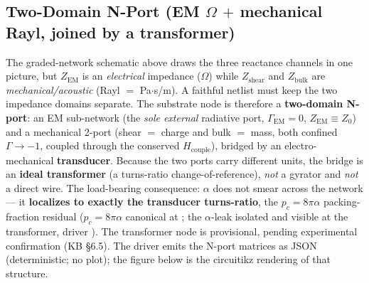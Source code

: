 \subsection{Two-Domain N-Port (EM $\Omega$ $+$ mechanical Rayl, joined by a transformer)}
\label{sec:vol9_node_2domain_nport}

\noindent The graded-network schematic above draws the three reactance channels in one picture, but $Z_{\mathrm{EM}}$ is an \emph{electrical} impedance ($\Omega$) while $Z_{\mathrm{shear}}$ and $Z_{\mathrm{bulk}}$ are \emph{mechanical/acoustic} (Rayl $=$ Pa$\cdot$s/m). A faithful netlist must keep the two impedance domains separate. The substrate node is therefore a \textbf{two-domain N-port}: an EM sub-network (the \emph{sole external} radiative port, $\Gamma_{\mathrm{EM}}=0$, $Z_{\mathrm{EM}}\equiv Z_0$) and a mechanical 2-port (shear $=$ charge and bulk $=$ mass, both confined $\Gamma\to-1$\gammaundeclared{}, coupled through the conserved $H_{\mathrm{couple}}$), bridged by an electro-mechanical \textbf{transducer}. Because the two ports carry different units, the bridge is an \textbf{ideal transformer} (a turns-ratio change-of-reference), \emph{not} a gyrator and \emph{not} a direct wire. The load-bearing consequence: $\alpha$ does not smear across the network --- it \textbf{localizes to exactly the transducer turns-ratio}, the $p_c = 8\pi\alpha$ packing-fraction residual ($p_c = 8\pi\alpha$ canonical at ; the $\alpha$-leak isolated and visible at the transformer, driver \texttt{}). The transformer node is provisional, pending experimental confirmation (KB  \S6.5). The driver emits the N-port matrices as JSON (deterministic; no plot); the figure below is the circuitikz rendering of that structure.



